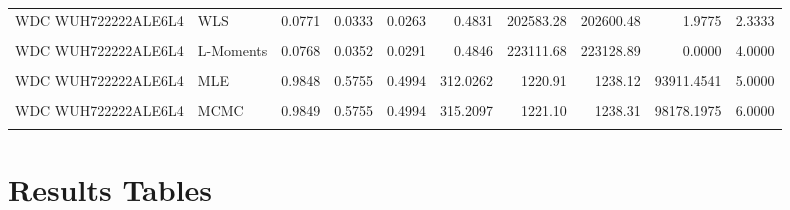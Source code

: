 \documentclass[
]{article}
\begin{document}
\begin{longtable}[t]{llrrrrrrrr}
WDC WUH722222ALE6L4 & WLS & 0.0771 & 0.0333 & 0.0263 & 0.4831 & 202583.28 & 202600.48 & 1.9775 & 2.3333\\
\addlinespace
\cellcolor{gray!10}{WDC WUH722222ALE6L4} & \cellcolor{gray!10}{MOM} & \cellcolor{gray!10}{0.0867} & \cellcolor{gray!10}{0.0375} & \cellcolor{gray!10}{0.0307} & \cellcolor{gray!10}{0.5275} & \cellcolor{gray!10}{230700.18} & \cellcolor{gray!10}{230717.39} & \cellcolor{gray!10}{0.0000} & \cellcolor{gray!10}{5.3333}\\
WDC WUH722222ALE6L4 & L-Moments & 0.0768 & 0.0352 & 0.0291 & 0.4846 & 223111.68 & 223128.89 & 0.0000 & 4.0000\\
\cellcolor{gray!10}{WDC WUH722222ALE6L4} & \cellcolor{gray!10}{EPF} & \cellcolor{gray!10}{0.0976} & \cellcolor{gray!10}{0.0412} & \cellcolor{gray!10}{0.0336} & \cellcolor{gray!10}{0.6171} & \cellcolor{gray!10}{239868.14} & \cellcolor{gray!10}{239885.34} & \cellcolor{gray!10}{0.0000} & \cellcolor{gray!10}{6.3333}\\
WDC WUH722222ALE6L4 & MLE & 0.9848 & 0.5755 & 0.4994 & 312.0262 & 1220.91 & 1238.12 & 93911.4541 & 5.0000\\
\cellcolor{gray!10}{WDC WUH722222ALE6L4} & \cellcolor{gray!10}{MAP} & \cellcolor{gray!10}{0.9845} & \cellcolor{gray!10}{0.5756} & \cellcolor{gray!10}{0.4996} & \cellcolor{gray!10}{340.4928} & \cellcolor{gray!10}{1271.91} & \cellcolor{gray!10}{1289.12} & \cellcolor{gray!10}{2276.5954} & \cellcolor{gray!10}{7.0000}\\
\addlinespace
WDC WUH722222ALE6L4 & MCMC & 0.9849 & 0.5755 & 0.4994 & 315.2097 & 1221.10 & 1238.31 & 98178.1975 & 6.0000\\
\cellcolor{gray!10}{WDC WUH722222ALE6L4} & \cellcolor{gray!10}{Percentile} & \cellcolor{gray!10}{0.1392} & \cellcolor{gray!10}{0.0605} & \cellcolor{gray!10}{0.0458} & \cellcolor{gray!10}{1.0983} & \cellcolor{gray!10}{220752.17} & \cellcolor{gray!10}{220769.37} & \cellcolor{gray!10}{7.2683} & \cellcolor{gray!10}{6.0000}\\*
\end{longtable}
\endgroup{}

\section{Results Tables}\label{results-tables}
\end{document}
